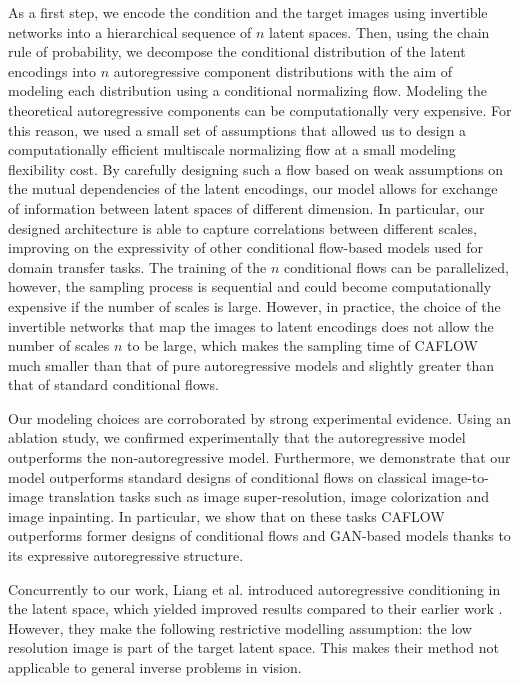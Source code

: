 As a first step, we encode the condition and the target images using invertible networks into a hierarchical sequence of $n$ latent spaces. Then, using the chain rule of probability, we decompose the conditional distribution of the latent encodings into $n$ autoregressive component distributions with the aim of modeling each distribution using a conditional normalizing flow. Modeling the theoretical autoregressive components can be computationally very expensive. For this reason, we used a small set of assumptions that allowed us to design a computationally efficient multiscale normalizing flow at a small modeling flexibility cost. By carefully designing such a flow based on weak assumptions on the mutual dependencies of the latent encodings, our model allows for exchange of information between latent spaces of different dimension. In particular, our designed architecture is able to capture correlations between different scales, improving on the expressivity of other conditional flow-based models used for domain transfer tasks. The training of the $n$ conditional flows can be parallelized, however, the sampling process is sequential and could become computationally expensive if the number of scales is large. However, in practice, the choice of the invertible networks that map the images to latent encodings does not allow the number of scales $n$ to be large, which makes the sampling time of CAFLOW much smaller than that of pure autoregressive models and slightly greater than that of standard conditional flows.

Our modeling choices are corroborated by strong experimental evidence. Using an ablation study, we confirmed experimentally that the autoregressive model outperforms the non-autoregressive model. Furthermore, we demonstrate that our model outperforms standard designs of conditional flows on classical image-to-image translation tasks such as image super-resolution, image colorization and image inpainting. In particular, we show that on these tasks CAFLOW outperforms former designs of conditional flows and GAN-based models thanks to its expressive autoregressive structure.

Concurrently to our work, Liang et al. \cite{HCFLOW} introduced autoregressive conditioning in the latent space, which yielded improved results compared to their earlier work \cite{SRFLOW}. 
However, they make the following restrictive modelling assumption: the low resolution image is part of the target latent space.  This makes their method not applicable to general inverse problems in vision. 

